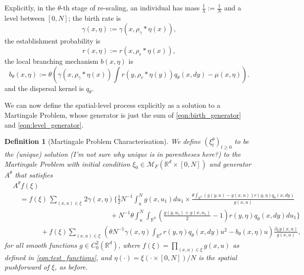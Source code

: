 \documentclass[12pt]{article}
\newtheorem{definition}[theorem]{Definition}
\newcommand{\IR}{\mathbb R}
\newcommand{\kernel}{\rho}  %
\newcommand{\smooth}[1]{\kernel_{#1} \! * \!}  %
\newcommand{\lp}{\xi}              %
\newcommand{\comment}[1]{{\color{blue} \it #1}}
\begin{document}
Explicitly, in the $\theta$-th stage of re-scaling,
an individual has mass $\frac{1}{\lambda} := \frac{1}{N}$
and a level between $[0,N]$;
the birth rate is
$$
    \gamma(x, \eta)
    :=
    \gamma(x, \smooth{\gamma}\eta(x)),
$$
the establishment probability is
$$
    r(x, \eta)
    :=
    r(x, \smooth{r}\eta(x)),
$$
the local branching mechanism $b(x,\eta)$ is 
$$
    b_{\theta}(x, \eta)
    :=
    \theta \left(
        \gamma(x, \smooth{\gamma}\eta(x))
        \int r(y, \smooth{r}\eta(y)) q_{\theta}(x,dy)
        -
        \mu(x, \eta)
    \right) .
$$
and the dispersal kernel is $q_\theta$.

We can now define the spatial-level process
explicitly as a solution to a Martingale Problem,
whose generator is just the sum of
\eqref{eqn:birth_generator} and \eqref{eqn:level_generator}.

\begin{definition}[Martingale Problem Characterisation]
    \label{defn:lookdown_mgale}
We define $(\lp^{\theta}_t)_{t \geq 0}$
to be the (unique) solution
    \comment{(I'm not sure why unique is in parentheses here?)}
to the Martingale Problem
with initial condition $\lp_0 \in \mathcal{M}_F(\mathbb{R}^d \times [0,N])$
and generator $A^{\theta}$ that satisfies
\begin{equation*}
\begin{split}
& A^{\theta}f(\lp ) \\
&\quad =
    f(\lp)
    \,\sum_{(x,u)\in \lp}\,
    2 \gamma(x, \eta)
    \Bigg\{ \frac 12 N^{-1}\int_u^N g(x,u_1) du_1
            \times
            \frac{
                \theta \int_{\mathbb{R}^d}
                (g(y,u) - g(x,u))
                r(y, \eta) q_{\theta}(x,dy)
            }{ g(x,u) }
        \\
    &\qquad\qquad\qquad\qquad\qquad\qquad\qquad {} +
        N^{-1}\theta\int_u^N
        \int_{\mathbb{R}^d}\left(
            \frac{ g(y,u_1) + g(x,u_1) }{ 2 } - 1
        \right)
        r(y, \eta) q_{\theta}(x,dy)
        du_1
    \Bigg\}\\
    &\qquad\qquad {} +
    f(\lp) \sum_{(x,u)\in\lp}\,
    \left(
        \theta N^{-1} \gamma(x,\eta) \int_{\IR^d} r(y, \eta) q_\theta(x, dy) u^2 -b_{\theta}(x,\eta)u
    \right)
    \frac{\partial_u g(x,u)}{g(x,u)}
    ,
\end{split}
\end{equation*}
for all smooth functions $g \in C^{2}_{0}(\mathbb{R}^d)$,
where $f(\lp) = \prod_{(x, u) \in \lp} g(x, u)$ as defined in \eqref{eqn:test_functions},
and $\eta(\cdot) = \lp(\cdot \times [0, N]) / N$ is the spatial pushforward of $\lp$,
as before.
\end{definition}
\end{document}
